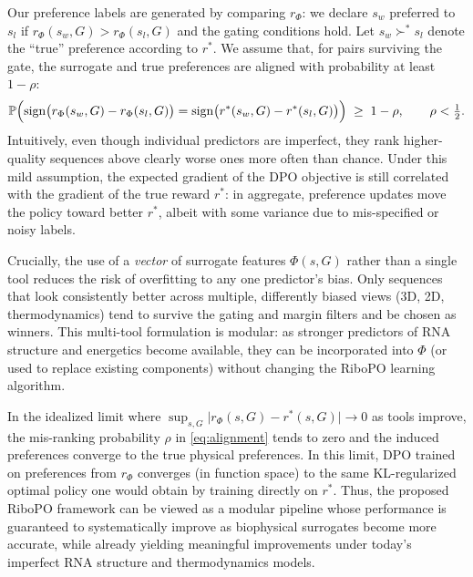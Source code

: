 {{Our preference labels are generated by comparing $r_\Phi$:
we declare $s_w$ preferred to $s_l$ if $r_\Phi(s_w,G) > r_\Phi(s_l,G)$ and
the gating conditions hold. Let $s_w \succ^* s_l$ denote the ``true''
preference according to $r^*$. We assume that, for pairs surviving the gate,
the surrogate and true preferences are aligned with probability at least
$1-\rho$:
\begin{equation}
    \mathbb{P}\Bigl(
        \operatorname{sign}\bigl(r_\Phi(s_w, G) - r_\Phi(s_l, G)\bigr)
        =
        \operatorname{sign}\bigl(r^*(s_w, G) - r^*(s_l, G)\bigr)
    \Bigr)
    \;\geq\; 1 - \rho,
    \qquad \rho < \tfrac{1}{2}.
    \label{eq:alignment}
\end{equation}
Intuitively, even though individual predictors are imperfect, they rank
higher-quality sequences above clearly worse ones more often than chance.
Under this mild assumption, the expected gradient of the DPO objective is
still correlated with the gradient of the true reward $r^*$: in aggregate,
preference updates move the policy toward better $r^*$, albeit with some
variance due to mis-specified or noisy labels.

Crucially, the use of a \emph{vector} of surrogate features
$\Phi(s,G)$ rather than a single tool reduces the risk of overfitting to any
one predictor's bias. Only sequences that look consistently better across
multiple, differently biased views (3D, 2D, thermodynamics) tend to survive
the gating and margin filters and be chosen as winners. This multi-tool
formulation is modular: as stronger predictors of RNA structure and
energetics become available, they can be incorporated into $\Phi$ (or used
to replace existing components) without changing the RiboPO learning
algorithm.

In the idealized limit where
$\sup_{s,G} \lvert r_\Phi(s,G) - r^*(s,G) \rvert \to 0$ as tools improve,
the mis-ranking probability $\rho$ in \eqref{eq:alignment} tends to zero and
the induced preferences converge to the true physical preferences. In this
limit, DPO trained on preferences from $r_\Phi$ converges (in function space)
to the same KL-regularized optimal policy one would obtain by training
directly on $r^*$. Thus, the proposed RiboPO framework can be viewed as
a modular pipeline whose performance is guaranteed to systematically improve
as biophysical surrogates become more accurate, while already yielding
meaningful improvements under today's imperfect RNA structure and
thermodynamics models.




















}}
